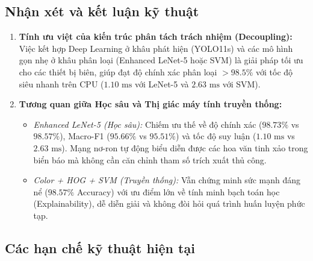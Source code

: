\documentclass[a4paper, 11pt]{article}
\begin{document}
\subsection{Nhận xét và kết luận kỹ thuật}
\label{subsec:nhan_xet_ky_thuat}

\begin{enumerate}
    \item \textbf{Tính ưu việt của kiến trúc phân tách trách nhiệm (Decoupling):} Việc kết hợp Deep Learning ở khâu phát hiện (YOLO11s) và các mô hình gọn nhẹ ở khâu phân loại (Enhanced LeNet-5 hoặc SVM) là giải pháp tối ưu cho các thiết bị biên, giúp đạt độ chính xác phân loại $> 98.5\%$ với tốc độ siêu nhanh trên CPU ($1.10\text{ ms}$ với LeNet-5 và $2.63\text{ ms}$ với SVM).
    \item \textbf{Tương quan giữa Học sâu và Thị giác máy tính truyền thống:}
    \begin{itemize}
        \item \textit{Enhanced LeNet-5 (Học sâu):} Chiếm ưu thế về độ chính xác ($98.73\%$ vs $98.57\%$), Macro-F1 ($95.66\%$ vs $95.51\%$) và tốc độ suy luận ($1.10\text{ ms}$ vs $2.63\text{ ms}$). Mạng nơ-ron tự động biểu diễn được các hoa văn tinh xảo trong biển báo mà không cần căn chỉnh tham số trích xuất thủ công.
        \item \textit{Color + HOG + SVM (Truyền thống):} Vẫn chứng minh sức mạnh đáng nể ($98.57\%$ Accuracy) với ưu điểm lớn về tính minh bạch toán học (Explainability), dễ diễn giải và không đòi hỏi quá trình huấn luyện phức tạp.
    \end{itemize}
\end{enumerate}

\subsection{Các hạn chế kỹ thuật hiện tại}
\label{subsec:han_che}
\end{document}
